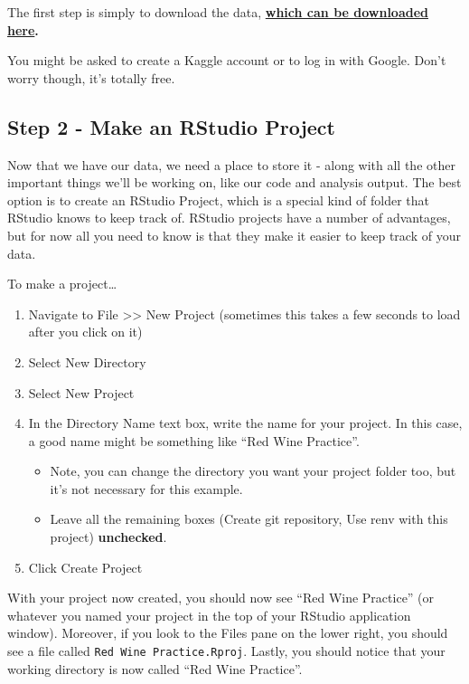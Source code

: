 \documentclass[
]{book}
\providecommand{\tightlist}{%
  \setlength{\itemsep}{0pt}\setlength{\parskip}{0pt}}
\begin{document}
The first step is simply to download the data, \textbf{\href{https://www.kaggle.com/uciml/red-wine-quality-cortez-et-al-2009/download}{which can be downloaded here}.}

You might be asked to create a Kaggle account or to log in with Google. Don't worry though, it's totally free.

\hypertarget{step-2---make-an-rstudio-project}{%
\subsection{Step 2 - Make an RStudio Project}\label{step-2---make-an-rstudio-project}}

Now that we have our data, we need a place to store it - along with all the other important things we'll be working on, like our code and analysis output. The best option is to create an RStudio Project, which is a special kind of folder that RStudio knows to keep track of. RStudio projects have a number of advantages, but for now all you need to know is that they make it easier to keep track of your data.

To make a project\ldots{}

\begin{enumerate}
\def\labelenumi{\arabic{enumi}.}
\tightlist
\item
  Navigate to File \textgreater\textgreater{} New Project (sometimes this takes a few seconds to load after you click on it)
\item
  Select New Directory
\item
  Select New Project
\item
  In the Directory Name text box, write the name for your project. In this case, a good name might be something like ``Red Wine Practice''.

  \begin{itemize}
  \tightlist
  \item
    Note, you can change the directory you want your project folder too, but it's not necessary for this example.
  \item
    Leave all the remaining boxes (Create git repository, Use renv with this project) \textbf{unchecked}.
  \end{itemize}
\item
  Click Create Project
\end{enumerate}

With your project now created, you should now see ``Red Wine Practice'' (or whatever you named your project in the top of your RStudio application window). Moreover, if you look to the Files pane on the lower right, you should see a file called \texttt{Red\ Wine\ Practice.Rproj}. Lastly, you should notice that your working directory is now called ``Red Wine Practice''.
\end{document}
